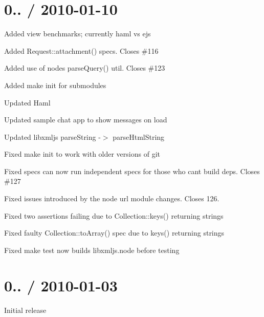 \section*{0.. / 2010-\/01-\/10 }


\begin{DoxyItemize}
\item Added view benchmarks; currently haml vs ejs
\item Added Request\+::attachment() specs. Closes \#116
\item Added use of node\textquotesingle{}s parse\+Query() util. Closes \#123
\item Added {\ttfamily make init} for submodules
\item Updated Haml
\item Updated sample chat app to show messages on load
\item Updated libxmljs parse\+String -\/$>$ parse\+Html\+String
\item Fixed {\ttfamily make init} to work with older versions of git
\item Fixed specs can now run independent specs for those who cant build deps. Closes \#127
\item Fixed issues introduced by the node url module changes. Closes 126.
\item Fixed two assertions failing due to Collection\+::keys() returning strings
\item Fixed faulty Collection\+::to\+Array() spec due to keys() returning strings
\item Fixed {\ttfamily make test} now builds libxmljs.\+node before testing
\end{DoxyItemize}

\section*{0.. / 2010-\/01-\/03 }


\begin{DoxyItemize}
\item Initial release 
\end{DoxyItemize}
